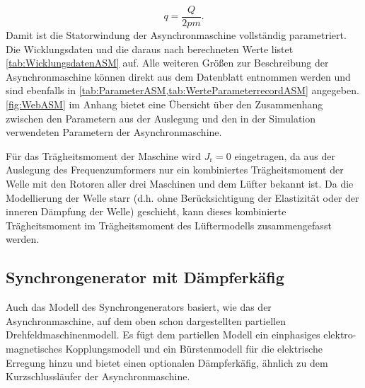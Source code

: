 \begin{equation}
    q = \frac{Q}{2pm}\label{eq:Lochzahl}.
\end{equation}
Damit ist die Statorwindung der Asynchronmaschine vollständig parametriert. Die Wicklungsdaten und die daraus nach  berechneten Werte listet \cref{tab:WicklungsdatenASM} auf. Alle weiteren Größen zur Beschreibung der Asynchronmaschine können direkt aus dem Datenblatt entnommen werden und sind ebenfalls in \cref{tab:ParameterASM,tab:WerteParameterrecordASM} angegeben. \cref{fig:WebASM} im Anhang bietet eine Übersicht über den Zusammenhang zwischen den Parametern aus der Auslegung und den in der Simulation verwendeten Parametern der Asynchronmaschine.

Für das Trägheitsmoment der Maschine wird \(J_{\mathrm{r}}=0\) eingetragen, da aus der Auslegung des Frequenzumformers nur ein kombiniertes Trägheitsmoment der Welle mit den Rotoren aller drei Maschinen und dem Lüfter bekannt ist. Da die Modellierung der Welle starr (d.h. ohne Berücksichtigung der Elastizität oder der inneren Dämpfung der Welle) geschieht, kann dieses kombinierte Trägheitsmoment im Trägheitsmoment des Lüftermodells zusammengefasst werden.

\subsection{Synchrongenerator mit Dämpferkäfig}\label{sec:synchrongenerator}

Auch das Modell des Synchrongenerators basiert, wie das der Asynchronmaschine, auf dem oben schon dargestellten partiellen Drehfeldmaschinenmodell. Es fügt dem partiellen Modell ein einphasiges elektro-magnetisches Kopplungsmodell und ein Bürstenmodell für die elektrische Erregung hinzu und bietet einen optionalen Dämpferkäfig, ähnlich zu dem Kurzschlussläufer der Asynchronmaschine.

